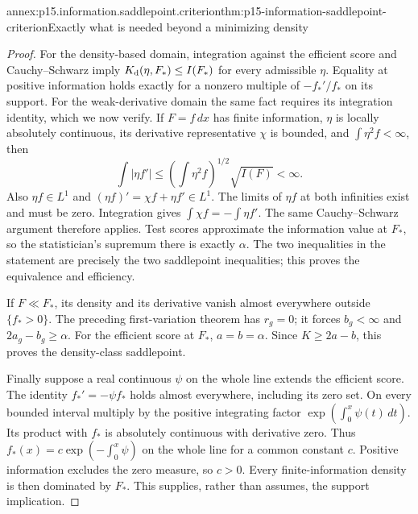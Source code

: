 \begin{annexitem}{annex:p15.information.saddlepoint.criterion}{thm:p15-information-saddlepoint-criterion}{Exactly what is needed beyond a minimizing density}
\begin{proof}
For the density-based domain, integration against the efficient score
and Cauchy--Schwarz imply \(K_{\rm d}(\eta,F_*)\leq I(F_*)\)
for every admissible \(\eta\). Equality at positive information holds
exactly for a nonzero multiple of \(-f_*'/f_*\) on its support.
For the weak-derivative domain the same fact requires its integration
identity, which we now verify. If \(F=f\,dx\) has finite information,
\(\eta\) is locally absolutely continuous, its derivative representative
\(\chi\) is bounded, and \(\int\eta^2f<\infty\), then
\[
 \int|\eta f'|\leq
       \left(\int\eta^2f\right)^{1/2}\sqrt{I(F)}<\infty.
\]
Also \(\eta f\in L^1\) and \((\eta f)'=\chi f+\eta f'\in L^1\).
The limits of \(\eta f\) at both infinities exist and must be zero.
Integration gives \(\int\chi f=-\int\eta f'\).
The same Cauchy--Schwarz argument therefore applies.
Test scores approximate the information value at \(F_*\), so the
statistician's supremum there is exactly \(\alpha\).
The two inequalities in the statement are precisely the two
saddlepoint inequalities; this proves the equivalence and efficiency.

If \(F\ll F_*\), its density and its derivative vanish almost everywhere
outside \(\{f_*>0\}\). The preceding first-variation theorem has
\(r_g=0\); it forces \(b_g<\infty\) and \(2a_g-b_g\geq\alpha\).
For the efficient score at \(F_*\), \(a=b=\alpha\).
Since \(K\geq2a-b\), this proves the density-class saddlepoint.

Finally suppose a real continuous \(\psi\) on the whole line extends
the efficient score. The identity \(f_*'=-\psi f_*\) holds almost
everywhere, including its zero set. On every bounded interval multiply
by the positive integrating factor \(\exp(\int_0^x\psi(t)\,dt)\).
Its product with \(f_*\) is absolutely continuous with derivative zero.
Thus \(f_*(x)=c\exp(-\int_0^x\psi)\) on the whole line for a common
constant \(c\). Positive information excludes the zero measure,
so \(c>0\). Every finite-information density is then dominated by
\(F_*\). This supplies, rather than assumes, the support implication.
\end{proof}
\end{annexitem}

